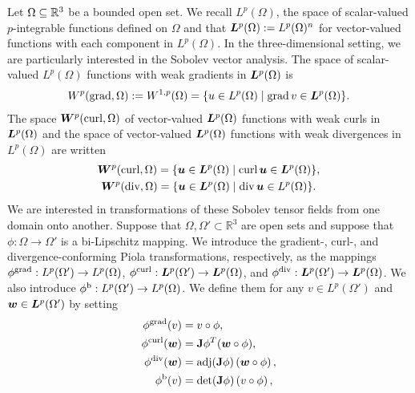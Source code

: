 \documentclass[10pt,a4paper]{article}
\newcommand\cye[1]{%
\protect\leavevmode
\begingroup
    \color{blue}%
    #1%
\endgroup
}
\begin{document}
Let $\Omega \subseteq {\mathbb R}^{3}$ be a bounded open set. 
We recall $L^{p}(\Omega)$, the space of scalar-valued $p$-integrable functions defined on $\Omega$
and that $\bm{L}^{p}(\Omega) := L^{p}(\Omega)^{n}$ for vector-valued functions with each component in $L^{p}(\Omega)$. 
In the three-dimensional setting, we are particularly interested in the Sobolev vector analysis. 
The space of scalar-valued $L^{p}(\Omega)$ functions with weak gradients in $\bm{L}^{p}(\Omega)$ is 
\begin{gather*}
    W^{p}(\grad,\Omega) := W^{1,p}(\Omega) = \{ u \in L^{p}(\Omega) \suchthat \grad v \in \bfL^{p}(\Omega) \}
    .
\end{gather*}
The space $\bm{W}^{p}(\operatorname{curl},\Omega)$ of vector-valued $\bm{L}^{p}(\Omega)$ functions with weak curls in $\bm{L}^{p}(\Omega)$
and the space of vector-valued $\bm{L}^{p}(\Omega)$ functions with weak divergences in $L^{p}(\Omega)$ are written 
\begin{gather*}
    \bfW^{p}(\curl,\Omega) = \{ \bfu \in \bfL^{p}(\Omega) \suchthat \curl \bfu \in \bfL^{p}(\Omega) \},
    \\ 
    \bfW^{p}(\divergence,\Omega) = \{ \bfu \in \bfL^{p}(\Omega) \suchthat \divergence \bfu \in L^{p}(\Omega) \}.
\end{gather*}
We are interested in transformations of these Sobolev tensor fields from one domain onto another. 
Suppose that $\Omega, \Omega' \subset \mathbb{R}^3$ are open sets and suppose that $\phi: \Omega \to \Omega'$ is a bi-Lipschitz mapping.
We introduce the gradient-, curl-, and divergence-conforming Piola transformations, respectively, as the mappings 
$\phi^{\operatorname{grad}}: L^{p}(\Omega') \to L^{p}(\Omega)$,
$\phi^{\operatorname{curl}}: \bm{L}^{p}(\Omega') \to \bm{L}^{p}(\Omega)$, and 
$\phi^{\operatorname{div}}: \bm{L}^{p}(\Omega') \to \bm{L}^{p}(\Omega)$.
We also introduce 
$\phi^{\rm b}: L^{p}(\Omega') \to L^{p}(\Omega)$. 
We define them 
for any $v \in L^{p}(\Omega')$ and $\bm{w} \in \bm{L}^{p}(\Omega')$ by setting 
\begin{subequations}\label{eq_definition_piola}
\begin{align*}
    \phi^{\operatorname{grad}}(v) &= v \circ \phi, \\
    \phi^{\operatorname{curl}}(\bm{w}) &= {\mathbf{J}}\phi^{T} (\bm{w} \circ \phi), \\
    \phi^{\operatorname{div}}(\bm{w}) &= \operatorname{adj}({\mathbf{J}}\phi) \left( \bm{w} \circ \phi \right), \\  
    \phi^{\rm b}(v) &= \det({\mathbf{J}}\phi) \left( v \circ \phi \right),
\end{align*}
\end{subequations}
\end{document}
